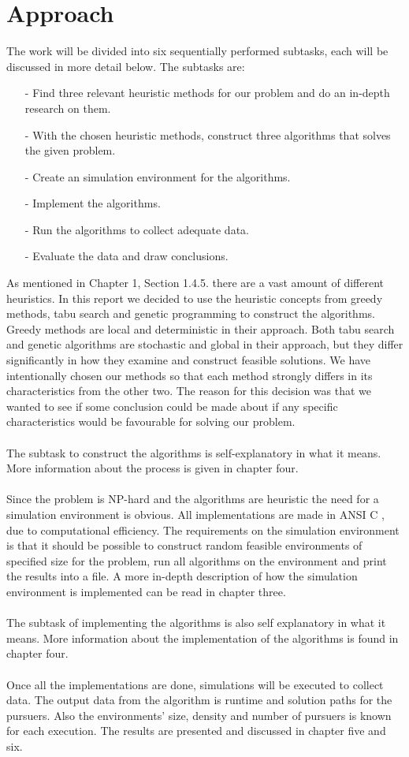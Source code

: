 \section{Approach}
The work will be divided into six sequentially performed subtasks, each will be discussed in more detail below. The subtasks are:
\begin{enumerate}
\item[-] Find three relevant heuristic methods for our problem and do an in-depth research on them.
\item[-] With the chosen heuristic methods, construct three algorithms that solves the given problem.
\item[-] Create an simulation environment for the algorithms.
\item[-] Implement the algorithms.
\item[-] Run the algorithms to collect adequate data.
\item[-] Evaluate the data and draw conclusions.
\end{enumerate}

As mentioned in Chapter 1, Section 1.4.5. there are a vast amount of different heuristics. In this report we decided to use the heuristic concepts from greedy methods, tabu search and genetic programming to construct the algorithms. Greedy methods are local and deterministic in their approach. Both tabu search and genetic algorithms are stochastic and global in their approach, but they differ significantly in how they examine and construct feasible solutions. We have intentionally chosen our methods so that each method strongly differs in its characteristics from the other two. The reason for this decision was that we wanted to see if some conclusion could be made about if any specific characteristics would be favourable for solving our problem.\\
\\
The subtask to construct the algorithms is self-explanatory in what it means. More information about the process is given in chapter four.\\
\\
Since the problem is NP-hard and the algorithms are heuristic the need for a simulation environment is obvious. All implementations are made in ANSI C \cite{C-bok}, due to computational efficiency. The requirements on the simulation environment is that it should be possible to construct random feasible environments of specified size for the problem, run all algorithms on the environment and print the results into a file. A more in-depth description of how the simulation environment is implemented can be read in chapter three.\\
\\
The subtask of implementing the algorithms is also self explanatory in what it means. More information about the implementation of the algorithms is found in chapter four.\\
\\
Once all the implementations are done, simulations will be executed to collect data. The output data from the algorithm is runtime and solution paths for the pursuers. Also the environments' size, density and number of pursuers is known for each execution. The results are presented and discussed in chapter five and six.